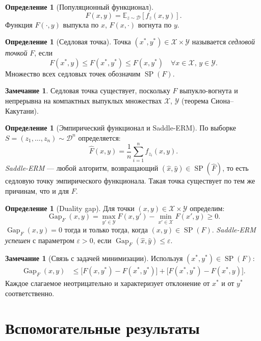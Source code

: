 \documentclass[12pt,a4paper]{article}
\theoremstyle{plain}
\theoremstyle{definition}
\newtheorem{definition}[theorem]{Определение}
\newtheorem{remark}[theorem]{Замечание}
\DeclareMathOperator{\Gap}{Gap}
\DeclareMathOperator{\SP}{SP}
\newcommand{\E}{\mathbb{E}}
\newcommand{\cX}{\mathcal{X}}
\newcommand{\cY}{\mathcal{Y}}
\newcommand{\cD}{\mathcal{D}}
\newcommand{\hatF}{\hat{F}}
\begin{document}
\begin{definition}[Популяционный функционал]
\[
    F(x,y)=\E_{z\sim\cD}[f_z(x,y)].
\]
Функция $F(\cdot,y)$ выпукла по $x$, $F(x,\cdot)$ вогнута по $y$.
\end{definition}

\begin{definition}[Седловая точка]
Точка $(x^*,y^*)\in\cX\times\cY$ называется \emph{седловой точкой} $F$, если
\[
    F(x^*,y)\le F(x^*,y^*)\le F(x,y^*) \quad\forall x\in\cX,\,y\in\cY.
\]
Множество всех седловых точек обозначим $\SP(F)$.
\end{definition}

\begin{remark}
Седловая точка существует, поскольку $F$ выпукло-вогнута и непрерывна на компактных выпуклых множествах $\cX$, $\cY$ (теорема Сиона--Какутани).
\end{remark}

\begin{definition}[Эмпирический функционал и Saddle-ERM]
По выборке $S=(z_1,\ldots,z_n)\sim\cD^n$ определяется:
\[
    \hatF(x,y)=\frac{1}{n}\sum_{i=1}^n f_{z_i}(x,y).
\]
\emph{Saddle-ERM} --- любой алгоритм, возвращающий $(\hat{x},\hat{y})\in\SP(\hatF)$, то есть седловую точку эмпирического функционала. Такая точка существует по тем же причинам, что и для $F$.
\end{definition}

\begin{definition}[Duality gap]
\label{def:gap}
Для точки $(x,y)\in\cX\times\cY$ определим:
\[
    \Gap_F(x,y)=\max_{y'\in\cY}F(x,y')-\min_{x'\in\cX}F(x',y)\ge 0.
\]
$\Gap_F(x,y)=0$ тогда и только тогда, когда $(x,y)\in\SP(F)$.
\emph{Saddle-ERM успешен} с параметром $\varepsilon>0$, если $\Gap_F(\hat{x},\hat{y})\le\varepsilon$.
\end{definition}

\begin{remark}[Связь с задачей минимизации]
Используя $(x^*,y^*)\in\SP(F)$:
\begin{align}
    \Gap_F(x,y)
    &\le \bigl[F(x,y^*)-F(x^*,y^*)\bigr]+\bigl[F(x^*,y^*)-F(x^*,y)\bigr].
    \label{eq:gap_decomp}
\end{align}
Каждое слагаемое неотрицательно и характеризует отклонение от $x^*$ и от $y^*$ соответственно.
\end{remark}

\section{Вспомогательные результаты}
\end{document}
